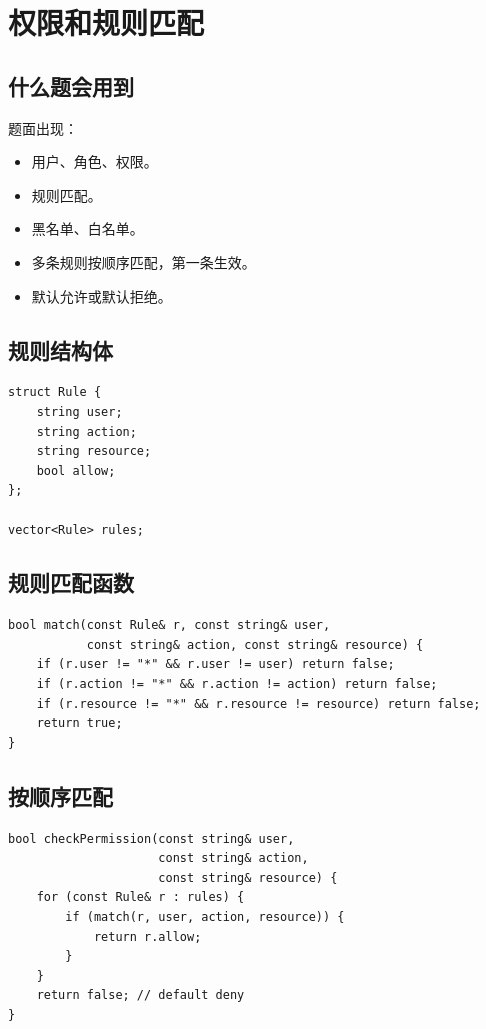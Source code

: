 \section{权限和规则匹配}\label{sec:07-27}

\subsection{什么题会用到}

题面出现：

\begin{itemize}
  \item 用户、角色、权限。
  \item 规则匹配。
  \item 黑名单、白名单。
  \item 多条规则按顺序匹配，第一条生效。
  \item 默认允许或默认拒绝。
\end{itemize}

\subsection{规则结构体}

\begin{lstlisting}
struct Rule {
    string user;
    string action;
    string resource;
    bool allow;
};

vector<Rule> rules;
\end{lstlisting}

\subsection{规则匹配函数}

\begin{lstlisting}
bool match(const Rule& r, const string& user,
           const string& action, const string& resource) {
    if (r.user != "*" && r.user != user) return false;
    if (r.action != "*" && r.action != action) return false;
    if (r.resource != "*" && r.resource != resource) return false;
    return true;
}
\end{lstlisting}

\subsection{按顺序匹配}

\begin{lstlisting}
bool checkPermission(const string& user,
                     const string& action,
                     const string& resource) {
    for (const Rule& r : rules) {
        if (match(r, user, action, resource)) {
            return r.allow;
        }
    }
    return false; // default deny
}
\end{lstlisting}

